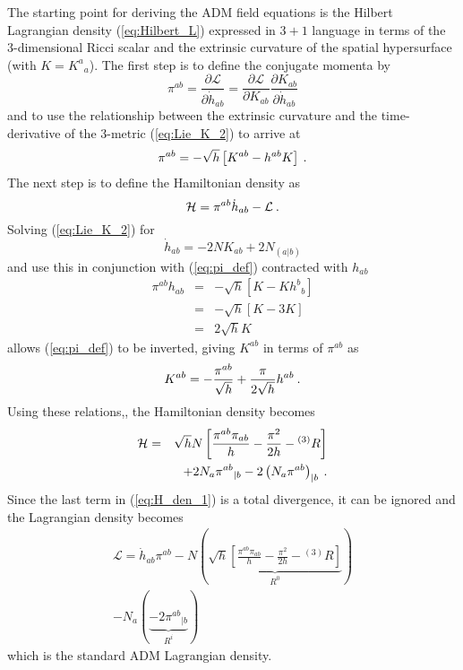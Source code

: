 The starting point for deriving the ADM field equations is the Hilbert Lagrangian
density (\ref{eq:Hilbert_L}) expressed in $3+1$ language in terms of the
3-dimensional Ricci scalar and the extrinsic curvature of the spatial
hypersurface (with $K= {K^a}_{a}$).  The first step is to define the conjugate
momenta by
\[
   \pi^{ab} = \frac{\partial {\mathcal L} } {\partial {\dot h}_{ab}}
            = \frac{\partial {\mathcal L} } {\partial K_{ab}}
              \frac{\partial K_{ab}}{\partial {\dot h}_{ab} }
\]
and to use the relationship between the extrinsic curvature and the
time-derivative of the 3-metric (\ref{eq:Lie_K_2}) to arrive at
\begin{equation}\label{eq:pi_def}
   \pi^{ab} = -\sqrt{h} \left[ K^{ab} - h^{ab} K \right] \: .
\end{equation}
The next step is to define the Hamiltonian density as
\[
   {\mathcal H} = \pi^{ab} {\dot h}_{ab} - {\mathcal L} \: .
\]
Solving (\ref{eq:Lie_K_2}) for
\[
   {\dot h}_{ab} = - 2 N K_{ab} + 2 N_{(a|b)}
\]
and use this in conjunction with (\ref{eq:pi_def}) contracted with $h_{ab}$
\begin{eqnarray*}
   \pi^{ab} h_{ab} & = & -\sqrt{h} \left[ K - K {h^b}_{b} \right] \\
                   & = & -\sqrt{h} \left[ K - 3 K \right] \\
                   & = & 2\sqrt{h} K
\end{eqnarray*}
allows (\ref{eq:pi_def}) to be inverted, giving $K^{ab}$ in terms of $\pi^{ab}$
as
\[
   K^{ab} = -\frac{\pi^{ab}}{\sqrt{h}} + \frac{\pi}{2 \sqrt{h}} h^{ab} \: .
\]
Using these relations,, the Hamiltonian density becomes
\begin{eqnarray}\label{eq:H_den_1}
   {\mathcal H} & = & \sqrt{h} N \left[ \frac{\pi^{ab} \pi_{ab}}{h} -
                                   \frac{ \pi^2}{2 h} - {}^{(3)}R
                            \right] \nonumber \\
               &   & + 2 N_a {\pi^{ab}}_{|b} - 2 \left( N_a \pi^{ab} \right)_{|b} \: .
\end{eqnarray}
Since the last term in (\ref{eq:H_den_1}) is a total divergence, it can be
ignored and the Lagrangian density becomes
\begin{eqnarray}
   {\mathcal L} = {\dot h}_{ab} \pi^{ab} - N \left(
                 \underbrace{ \sqrt{h}
                 \left[ \frac{\pi^{ab} \pi_{ab}}{h} -
                        \frac{ \pi^2}{2 h} - {}^{(3)}R
                 \right]}_{R^0} \right) \nonumber \\
                 - N_a \left( \underbrace{ -2  {\pi^{ab}}_{|b}}_{R^i} \right)
\end{eqnarray}
which is the standard ADM Lagrangian density.

